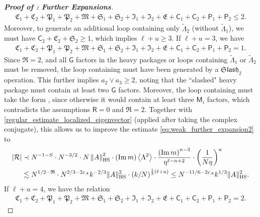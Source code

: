 \documentclass[10pt,reqno]{amsart}
\numberwithin{equation}{section}
\numberwithin{figure}{section}
\theoremstyle{plain} %
\theoremstyle{definition} %
\newcommand{\wt}{\widetilde}
\renewcommand{\txt}[1]{\text{\rm{#1}}}
\newcommand{\cR}{{\mathcal R}}
\newcommand{\fR}{\mathfrak R}
\newcommand{\fC}{\mathfrak C}
\newcommand{\fP}{\mathfrak P}
\newcommand{\fM}{\mathfrak M}
\newcommand{\fS}{\mathfrak S}
\newcommand{\fI}{\mathfrak I}
\newcommand{\fE}{\mathfrak E}
\newcommand{\sG}{\mathsf G}
\newcommand{\sM}{\mathsf M}
\newcommand{\sR}{\mathsf R}
\newcommand{\sC}{\mathsf C}
\newcommand{\sP}{\mathsf P}
\renewcommand{\leq}{\le}
\renewcommand{\geq}{\ge}
\newcommand{\p}[1]{({#1})}
\newcommand{\pa}[1]{\left({#1}\right)}
\newcommand{\absa}[1]{\left\lvert #1 \right\rvert}
\newcommand{\norm}[1]{\lVert #1 \rVert}
\newcommand{\norma}[1]{\left\lVert #1 \right\rVert}
\newcommand{\avg}[1]{\langle #1 \rangle}
\newcommand{\avga}[1]{\left\langle #1 \right\rangle}
\DeclareMathOperator{\im}{\mathrm{Im}}
\newcommand{\tLambda}{{\wt{\Lambda}}}
\newcommand{\fslash}[1]{\mathfrak{Slash}_{#1}}
\newcommand{\HS}{\txt{HS}}
\newcommand{\tl}{\tLambda}
\newcommand{\mm}{\ell}
\numberwithin{equation}{section}
\begin{document}
\begin{proof}[\bf Proof of : Further Expansions]
\begin{equation}
            \begin{aligned}
                \fC_1+\fC_2+\fP_1+\fP_2+\fM+\fS_1+\fS_2+\fI_1+\fI_2+\fE+\sC_1+\sC_2+\sP_1+\sP_2\leq 2.
            \end{aligned}
        \end{equation}
        Moreover, to generate an additional loop containing only $\tl_2$ (without $\tl_1$), we must have $\sC_2+\fC_2+\fS_2\geq 1$, which implies $\mm+u\geq 3$. If $\mm+u=3$, we have
        \begin{equation}\nonumber
            \begin{aligned}
                \fC_1+\fC_2+\fP_1+\fP_2+\fM+\fS_1+\fS_2+\fI_1+\fI_2+\fE+\sC_1+\sC_2+\sP_1+\sP_2=1.
            \end{aligned}
        \end{equation}
        Since $\fR=2$, and all $\sG$ factors in the heavy packages or loops containing $\tl_1$ or $\tl_2$ must be removed, the loop containing \smash{$\tl_2$} must have been generated by a $\fslash{2}$ operation. This further implies $a_2\vee a_3\geq 2$, noting that the ``slashed" heavy package must contain at least two $\sG$ factors. Moreover, the loop containing \smash{$\tl_2$} must take the form \smash{$\avg{\sM_1\tl_2\sM_0 E_x}$}, since otherwise it would contain at least three $\sM_i$ factors, which contradicts the assumptions $\sR=0$ and $\fR=2$.     
        Together with \eqref{regular_estimate_localized_eigenvector} (applied after taking the complex conjugate), this allows us to improve the estimate \eqref{eq:weak_further_expansion2} to 
        \begin{equation}\nonumber
            \begin{aligned}
                \absa{\cR}&\prec N^{-1-S}\cdot N^{-3/2}\cdot N\norma{A}_{\HS}^2\cdot \p{\im m} \avga{\Lambda^2}\cdot \frac{\pa{\im m}^{n-3}}{\eta^{\mm-n+2}}\cdot \pa{\frac{1}{N\eta}}^{u}\\
                &\lesssim N^{1/2-\fR}\cdot N^{2/3-2\varepsilon_A}k^{-2/3}\norm{A}_{\HS}^2\cdot\pa{k/N}^{\frac13\p{\mm+u}}\leq N^{-11/6-2\varepsilon_A}k^{1/3}\norm{A}_{\HS}^2.
            \end{aligned}
        \end{equation}
        If $\mm+u=4$, we have the relation
        \begin{equation}\nonumber
            \begin{aligned}
                \fC_1+\fC_2+\fP_1+\fP_2+\fM+\fS_1+\fS_2+\fI_1+\fI_2+\fE+\sC_1+\sC_2+\sP_1+\sP_2=2.

\end{aligned}
\end{equation}
\end{proof}
\end{document}
